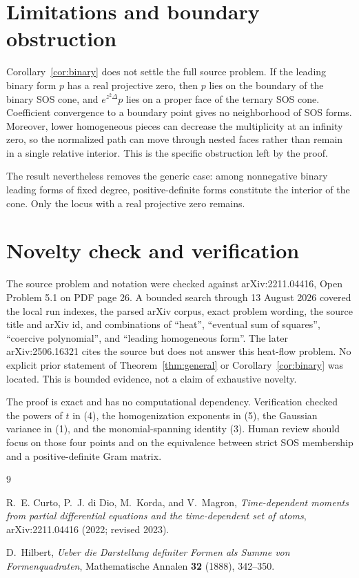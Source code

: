 \documentclass[11pt]{article}
\begin{document}
\section{Limitations and boundary obstruction}

Corollary~\ref{cor:binary} does not settle the full source problem.  If the
leading binary form $p$ has a real projective zero, then $p$ lies on the
boundary of the binary SOS cone, and $e^{z^2\Delta}p$ lies on a proper face of
the ternary SOS cone.  Coefficient convergence to a boundary point gives no
neighborhood of SOS forms.  Moreover, lower homogeneous pieces can decrease
the multiplicity at an infinity zero, so the normalized path can move through
nested faces rather than remain in a single relative interior.  This is the
specific obstruction left by the proof.

The result nevertheless removes the generic case: among nonnegative binary
leading forms of fixed degree, positive-definite forms constitute the interior
of the cone.  Only the locus with a real projective zero remains.

\section{Novelty check and verification}

The source problem and notation were checked against arXiv:2211.04416, Open
Problem 5.1 on PDF page 26.  A bounded search through 13 August 2026 covered
the local run indexes, the parsed arXiv corpus, exact problem wording, the
source title and arXiv id, and combinations of ``heat'', ``eventual sum of
squares'', ``coercive polynomial'', and ``leading homogeneous form''.  The
later arXiv:2506.16321 cites the source but does not answer this heat-flow
problem.  No explicit prior statement of Theorem~\ref{thm:general} or
Corollary~\ref{cor:binary} was located.  This is bounded evidence, not a claim
of exhaustive novelty.

The proof is exact and has no computational dependency.  Verification checked
the powers of $t$ in (4), the homogenization exponents in (5), the Gaussian
variance in (1), and the monomial-spanning identity (3).  Human review should
focus on those four points and on the equivalence between strict SOS
membership and a positive-definite Gram matrix.

\begin{thebibliography}{9}

R.~E. Curto, P.~J. di Dio, M.~Korda, and V.~Magron,
\emph{Time-dependent moments from partial differential equations and the
time-dependent set of atoms}, arXiv:2211.04416 (2022; revised 2023).

D.~Hilbert,
\emph{Ueber die Darstellung definiter Formen als Summe von Formenquadraten},
Mathematische Annalen \textbf{32} (1888), 342--350.

\end{thebibliography}
\end{document}

